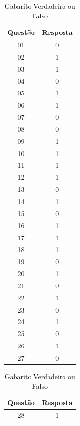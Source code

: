 \documentclass[12pt,a4paper,titlepage]{article}
\begin{document}
\begin{table}[h]
    \centering
    \caption{Gabarito Verdadeiro ou Falso}
    \begin{tabular}{|c|c|}
        \hline
        \textbf{Questão} & \textbf{Resposta} \\
        \hline
        01 & 0 \\
        \hline
        02 & 1 \\
        \hline
        03 & 1 \\
        \hline
        04 & 0 \\
        \hline
        05 & 1 \\
        \hline
        06 & 1 \\
        \hline
        07 & 0 \\
        \hline
        08 & 0 \\
        \hline
        09 & 1 \\
        \hline
        10 & 1 \\
        \hline
        11 & 1 \\
        \hline
        12 & 1 \\
        \hline
        13 & 0 \\
        \hline
        14 & 1 \\
        \hline
        15 & 0 \\
        \hline
        16 & 1 \\
        \hline
        17 & 1 \\
        \hline
        18 & 1 \\
        \hline
        19 & 0 \\
        \hline
        20 & 1 \\
        \hline
        21 & 0 \\
        \hline
        22 & 1 \\
        \hline
        23 & 0 \\
        \hline
        24 & 1 \\
        \hline
        25 & 0 \\
        \hline
        26 & 1 \\
        \hline
        27 & 0 \\
        \hline
    \end{tabular}
    \hspace{1cm}
    \begin{tabular}{|c|c|}
        \hline
        \textbf{Questão} & \textbf{Resposta} \\
        \hline
        28 & 1 \\

\end{tabular}
\end{table}
\end{document}
